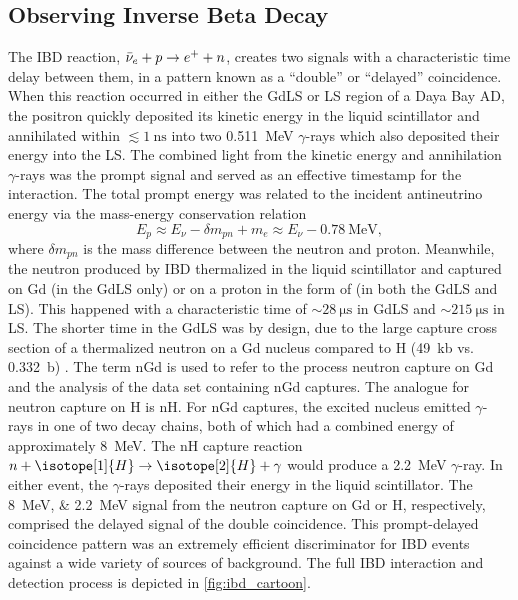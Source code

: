 \subsection{Observing Inverse Beta Decay}
\label{subsec:ibd_intro}

The IBD reaction, $\bar{\nu}_e + p \to e^+ + n$,
creates two signals with a characteristic
time delay between them, in a pattern known as a ``double''
or ``delayed'' coincidence.
When this reaction occurred in either the GdLS or LS region
of a Daya Bay AD,
the positron quickly deposited its kinetic energy in the liquid scintillator
and annihilated within $\lesssim\SI{1}{\nano\second}$
into two \SI{0.511}{\MeV} $\gamma$-rays
which also deposited their energy into the LS.
The combined light from the kinetic energy and annihilation $\gamma$-rays
was the prompt signal
and served as an effective timestamp for the interaction.
The total prompt energy was related to the incident antineutrino energy
via the mass-energy conservation relation
\begin{equation}\label{eq:prompt_vs_nu_energy}
    E_p \approx E_\nu - \delta m_{pn} + m_e \approx E_\nu - \SI{0.78}{\MeV},
\end{equation}
where $\delta m_{pn}$ is the mass difference between the neutron and proton.
Meanwhile, the neutron produced by IBD thermalized in the liquid scintillator
and captured on Gd (in the GdLS only) or on a proton in the form of 
(in both the GdLS and LS).
This happened with a characteristic time of $\sim \SI{28}{\micro\second}$
in GdLS and $\sim \SI{215}{\micro\second}$ in LS.
The shorter time in the GdLS was by design,
due to the large capture cross section of a thermalized neutron
on a Gd nucleus compared to H (\SI{49}{\kilo\barn} vs. \SI{0.332}{\barn})
\cite{gdls2014}.
The term nGd is used to refer to the process neutron capture on Gd
and the analysis of the data set containing nGd captures.
The analogue for neutron capture on H is nH.
For nGd captures, the excited nucleus
emitted $\gamma$-rays in one of two decay chains,
both of which had a combined energy of approximately \SI{8}{\MeV}.
The nH capture reaction $n+\isotope[1]{H} \to \isotope[2]{H} + \gamma$
would produce a \SI{2.2}{\MeV} $\gamma$-ray.
In either event, the $\gamma$-rays deposited their energy
in the liquid scintillator.
The \SIlist[list-pair-separator = { or }]{8;2.2}{\MeV} signal
from the neutron capture on Gd or H, respectively, comprised the delayed signal of the
double coincidence.
This prompt-delayed coincidence pattern was an extremely efficient
discriminator for IBD events against a wide variety of sources of background.
The full IBD interaction and detection process
is depicted in \cref{fig:ibd_cartoon}.

